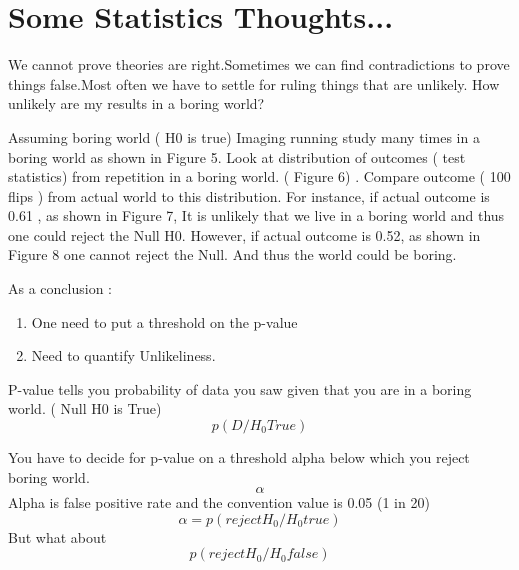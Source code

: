 \section{Some Statistics Thoughts...}
We cannot prove theories are right.Sometimes we can find contradictions to prove things false.Most often we have to settle for ruling things that are unlikely. How unlikely are my results in a boring world?  

Assuming boring world ( H0 is true) 
Imaging running study many times in a boring world as shown in Figure 5. 
Look at distribution of outcomes ( test statistics) from repetition in a boring world. ( Figure 6) . 
Compare outcome ( 100 flips ) from actual world to this distribution. For instance, if actual outcome is 0.61 , as shown in Figure 7, It is unlikely that we live in a boring world and thus one could reject the Null H0. 
However, if actual outcome is 0.52, as shown in Figure 8 one cannot reject the Null. And thus the world could be boring. 

As a conclusion :
\begin{enumerate}
\item One need to put a threshold on the p-value
\item  Need to quantify Unlikeliness. 
\end{enumerate}


P-value tells you probability of data you saw given that you are in a boring world. ( Null H0 is True) 
 \begin{equation}
  p(D/H_{0} True)
\end{equation}

You have to decide for p-value on a threshold alpha below which you reject boring world. 
 \begin{equation}
  \alpha
\end{equation} 
Alpha is false positive rate and the convention value is 0.05 (1 in 20) 
\begin{equation}
\alpha= p( reject H_{0}/H_{0} true)
\end{equation}
But what about 
\begin{equation}
p( reject H_{0}/H_{0} false)
\end{equation} 

